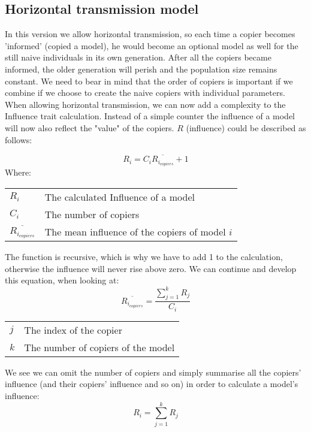 \documentclass[11pt]{article}
\makeatletter
\newenvironment{conditions}
  {\par\vspace{\abovedisplayskip}\noindent\begin{tabular}{>{$}l<{$} @{${}={}$} l}}
  {\end{tabular}\par\vspace{\belowdisplayskip}}
\makeatother
\begin{document}
 \subsection{Horizontal transmission model}\label{horizontal model}
 In this version we allow horizontal transmission, so each time a copier becomes 'informed' (copied a model), he would become an optional model as well for the still naive individuals in its own generation.
 After all the copiers became informed, the older generation will perish and the population size remains constant.
 We need to bear in mind that the order of copiers is important if we combine if we choose to create the naive copiers with individual parameters.
 When allowing horizontal transmission, we can now add a complexity to the Influence trait calculation. Instead of a simple counter the influence of a model will now also reflect the "value" of the copiers.
 $R$ (influence) could be described as follows:
 
 \begin{equation}
	R_i = C_i \overline{R_{i_{copiers}}} + 1
\end{equation}
Where:
\begin{conditions}
R_i & The calculated Influence of a model\\
C_i & The number of copiers\\
\overline{R_{i_{copiers}}} & The mean influence of the copiers of model $i$
\end{conditions}
The function is recursive, which is why we have to add 1 to the calculation, otherwise the influence will never rise above zero.
We can continue and develop this equation, when looking at:
 \begin{equation}
	\overline{R_{i_{copiers}}} = \frac{\sum\limits_{j=1}^{k} R_j}{C_i}
\end{equation}
\begin{conditions}
j & The index of the copier\\
k & The number of copiers of the model
\end{conditions}
We see we can omit the number of copiers and simply summarise all the copiers' influence (and their copiers' influence and so on) in order to calculate a model's influence:
 \begin{equation}
	R_i = \sum\limits_{j=1}^{k} R_j
\end{equation}
 
\end{document}
